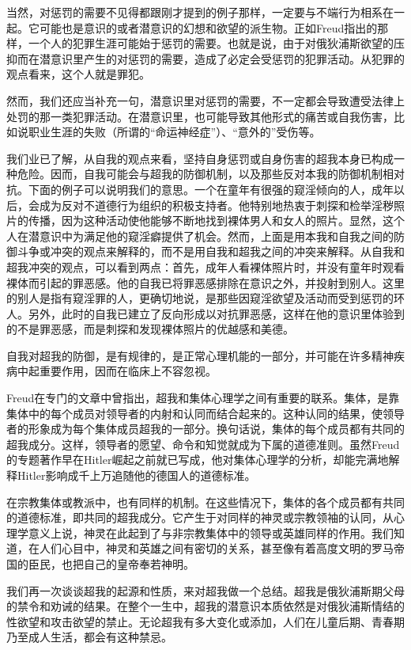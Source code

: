 \documentclass[UTF8,10pt,a4paper,openany]{book}
\begin{document}
当然，对惩罚的需要不见得都跟刚才提到的例子那样，一定要与不端行为相系在一起。它可能也是意识的或者潜意识的幻想和欲望的派生物。正如Freud指出的那样，一个人的犯罪生涯可能始于惩罚的需要。也就是说，由于对俄狄浦斯欲望的压抑而在潜意识里产生的对惩罚的需要，造成了必定会受惩罚的犯罪活动。从犯罪的观点看来，这个人就是罪犯。

然而，我们还应当补充一句，潜意识里对惩罚的需要，不一定都会导致遭受法律上处罚的那一类犯罪活动。在潜意识里，也可能导致其他形式的痛苦或自我伤害，比如说职业生涯的失败（所谓的“命运神经症”）、“意外的”受伤等。

我们业已了解，从自我的观点来看，坚持自身惩罚或自身伤害的超我本身已构成一种危险。因而，自我可能会与超我的防御机制，以及那些反对本我的防御机制相对抗。下面的例子可以说明我们的意思。一个在童年有很强的窥淫倾向的人，成年以后，会成为反对不道德行为组织的积极支持者。他特别地热衷于刺探和检举淫秽照片的传播，因为这种活动使他能够不断地找到裸体男人和女人的照片。显然，这个人在潜意识中为满足他的窥淫癖提供了机会。然而，上面是用本我和自我之间的防御斗争或冲突的观点来解释的，而不是用自我和超我之间的冲突来解释。从自我和超我冲突的观点，可以看到两点：首先，成年人看裸体照片时，并没有童年时观看裸体而引起的罪恶感。他的自我已将罪恶感排除在意识之外，并投射到别人。这里的别人是指有窥淫罪的人，更确切地说，是那些因窥淫欲望及活动而受到惩罚的环人。另外，此时的自我已建立了反向形成以对抗罪恶感，这样在他的意识里体验到的不是罪恶感，而是刺探和发现裸体照片的优越感和美德。

自我对超我的防御，是有规律的，是正常心理机能的一部分，并可能在许多精神疾病中起重要作用，因而在临床上不容忽视。

Freud在专门的文章中曾指出，超我和集体心理学之间有重要的联系。集体，是靠集体中的每个成员对领导者的内射和认同而结合起来的。这种认同的结果，使领导者的形象成为每个集体成员超我的一部分。换句话说，集体的每个成员都有共同的超我成分。这样，领导者的愿望、命令和知觉就成为下属的道德准则。虽然Freud的专题著作早在Hitler崛起之前就已写成，他对集体心理学的分析，却能完满地解释Hitler影响成千上万追随他的德国人的道德标准。

在宗教集体或教派中，也有同样的机制。在这些情况下，集体的各个成员都有共同的道德标准，即共同的超我成分。它产生于对同样的神灵或宗教领袖的认同，从心理学意义上说，神灵在此起到了与非宗教集体中的领导或英雄同样的作用。我们知道，在人们心目中，神灵和英雄之间有密切的关系，甚至像有着高度文明的罗马帝国的臣民，也把自己的皇帝奉若神明。

我们再一次谈谈超我的起源和性质，来对超我做一个总结。超我是俄狄浦斯期父母的禁令和劝诫的结果。在整个一生中，超我的潜意识本质依然是对俄狄浦斯情结的性欲望和攻击欲望的禁止。无论超我有多大变化或添加，人们在儿童后期、青春期乃至成人生活，都会有这种禁忌。
\end{document}
